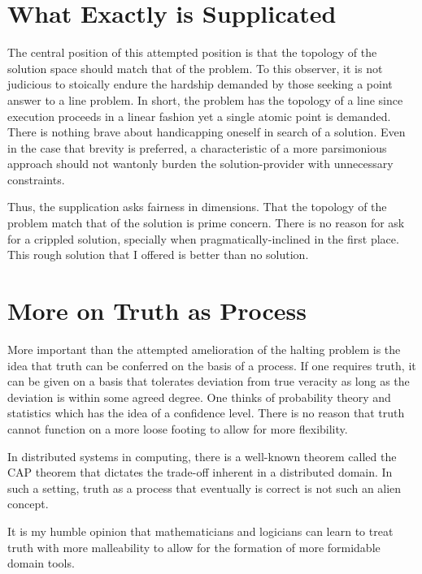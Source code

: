 \documentclass{article}
\begin{document}
	\section{What Exactly is Supplicated}
	
	The central position of this attempted position is that the topology of the solution space should match that of the problem. To this observer, it is not judicious to stoically endure the hardship demanded by those seeking a point answer to a line problem. In short, the problem has the topology of a line since execution proceeds in a linear fashion yet a single atomic point is demanded. There is nothing brave about handicapping oneself in search of a solution. Even in the case that brevity is preferred, a characteristic of a more parsimonious approach should not wantonly burden the solution-provider with unnecessary constraints.
	
	Thus, the supplication asks fairness in dimensions. That the topology of the problem match that of the solution is prime concern. There is no reason for ask for a crippled solution, specially when pragmatically-inclined in the first place. This rough solution that I offered is better than no solution.
	
	\section{More on Truth as Process}
	More important than the attempted amelioration of the halting problem is the idea that truth can be conferred on the basis of a process. If one requires truth, it can be given on a basis that tolerates deviation from true veracity as long as the deviation is within some agreed degree. One thinks of probability theory and statistics which has the idea of a confidence level. There is no reason that truth cannot function on a more loose footing to allow for more flexibility.
	
	In distributed systems in computing, there is a well-known theorem called the CAP theorem that dictates the trade-off inherent in a distributed domain. In such a setting, truth as a process that eventually is correct is not such an alien concept.
	
	It is my humble opinion that mathematicians and logicians can learn to treat truth with more malleability to allow for the formation of more formidable domain tools.
\end{document}

